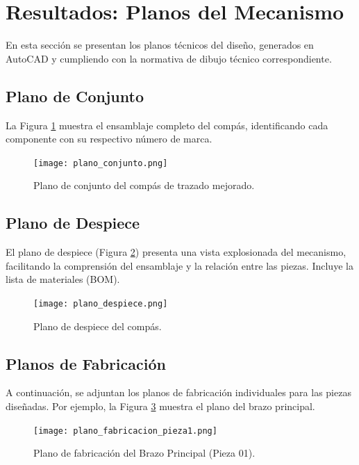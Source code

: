\documentclass[11pt, a4paper]{article}
\begin{document}
\section{Resultados: Planos del Mecanismo}
En esta sección se presentan los planos técnicos del diseño, generados en AutoCAD y cumpliendo con la normativa de dibujo técnico correspondiente.
    
\subsection{Plano de Conjunto}
La Figura \ref{fig:conjunto} muestra el ensamblaje completo del compás, identificando cada componente con su respectivo número de marca.

\begin{figure}[H]
    \centering
    \texttt{[image: plano\_conjunto.png]}
    \caption{Plano de conjunto del compás de trazado mejorado.}
    \label{fig:conjunto}
\end{figure}

\subsection{Plano de Despiece}
El plano de despiece (Figura \ref{fig:despiece}) presenta una vista explosionada del mecanismo, facilitando la comprensión del ensamblaje y la relación entre las piezas. Incluye la lista de materiales (BOM).

\begin{figure}[H]
    \centering
    \texttt{[image: plano\_despiece.png]}
    \caption{Plano de despiece del compás.}
    \label{fig:despiece}
\end{figure}

\subsection{Planos de Fabricación}
A continuación, se adjuntan los planos de fabricación individuales para las piezas diseñadas. Por ejemplo, la Figura \ref{fig:fabricacion} muestra el plano del brazo principal.

\begin{figure}[H]
    \centering
    \texttt{[image: plano\_fabricacion\_pieza1.png]}
    \caption{Plano de fabricación del Brazo Principal (Pieza 01).}
    \label{fig:fabricacion}
\end{figure}

\newpage
\printbibliography[title={Referencias Bibliográficas}]
\end{document}
